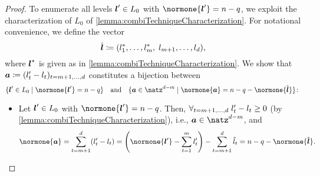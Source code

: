 \begin{proof}
  To enumerate all levels ${\boldsymbol{l}}' \in L_0$ with $\normone{\*l'} = n - q$,
  we exploit the characterization of $L_0$ of
  \cref{lemma:combiTechniqueCharacterization}.
  For notational convenience, we define the vector
  \begin{equation}
    \hat{{\boldsymbol{l}}}
    \coloneqq (l^\ast_1, \dotsc, l^\ast_m,\; l_{m+1}, \dotsc, l_d),
  \end{equation}
  where ${\boldsymbol{l}}^\ast$ is given as in \cref{lemma:combiTechniqueCharacterization}.
  We show that ${\boldsymbol{a}} \coloneqq (l'_t - l_t)_{t = m+1, \dotsc, d}$
  constitutes a bijection between
  \begin{equation}
    \{\*l' \in L_0 \mid \normone{\*l'} = n - q\}
    \quad\text{and}\quad
    \{\*a \in \natz^{d-m} \mid \normone{\*a} = n - q - \normone{\hat{\*l}}\}
    \colon
  \end{equation}
  \begin{itemize}
    \item
    Let ${\boldsymbol{l}}' \in L_0$ with $\normone{\*l'} = n - q$.
    Then, $\forall_{t=m+1,\dotsc,d}\;l'_t - l_t \ge 0$
    (by \cref{lemma:combiTechniqueCharacterization}), i.e.,
    $\*a \in \natz^{d-m}$, and
    \begin{equation}
      \normone{\*a}
      = \sum_{t=m+1}^d (l'_t - l_t)
      = \paren*{\normone{\*l'} - \sum_{t=1}^m l'_t} -
      \sum_{t=m+1}^d \hat{l}_t
      = n - q - \normone{\hat{\*l}}.
    \end{equation}
    

\end{itemize}
\end{proof}
